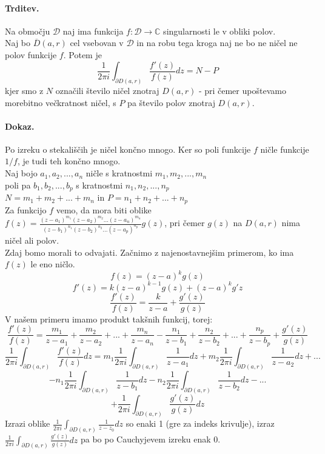\documentclass[a4paper]{article}
\newcommand{\C}{\mathbb{C}}
\newcommand{\fn}[3]{{#1}\colon {#2} \rightarrow {#3}}
\begin{document}
\paragraph{Trditev.} Na območju $\mathcal{D}$ naj ima funkcija $\fn{f}{\mathcal{D}}{\C}$ singularnosti le v obliki polov. \\
Naj bo $\overline{D}(a, r)$ cel vsebovan v $\mathcal{D}$ in na robu tega kroga naj ne bo ne ničel ne polov funkcije $f$. Potem je 
$$\frac{1}{2\pi i}\int_{\partial D(a, r)}\frac{f'(z)}{f(z)}dz = N - P$$
kjer smo z $N$ označili število ničel znotraj $D(a, r)$ - pri čemer upoštevamo morebitno večkratnost ničel, s $P$ pa število polov znotraj $D(a ,r)$. \\
\paragraph{Dokaz.} Po izreku o stekališčih je ničel končno mnogo. Ker so poli funkcije $f$ ničle funkcije $1/f$, je tudi teh končno mnogo. \\
Naj bojo $a_1, a_2, ..., a_n$ ničle s kratnostmi $m_1, m_2, ..., m_n$ \\
poli pa $b_1, b_2, ..., b_p$ s kratnostmi $n_1, n_2, ..., n_p$ \\
$N = m_1 + m_2 + ... + m_n$ in $P = n_1 + n_2 + ... + n_p$ \\
Za funkcijo $f$ vemo, da mora biti oblike $\displaystyle{f(z) = \frac{(z-a_1)^{m_1}(z-a_2)^{m_2}...(z-a_n)^{m_n}}{(z-b_1)^{n_1}(z-b_2)^{n_2}...(z-a_p)^{n_p}}g(z)}$, pri čemer $g(z)$ na $D(a, r)$ nima ničel ali polov. \\
Zdaj bomo morali to odvajati. Začnimo z najenostavnejšim primerom, ko ima $f(z)$ le eno ničlo.
$$f(z) = (z-a)^kg(z)$$
$$f'(z) = k(z-a)^{k-1}g(z) + (z-a)^kg'z$$
$$\frac{f'(z)}{f(z)} = \frac{k}{z-a} + \frac{g'(z)}{g(z)}$$
V našem primeru imamo produkt takšnih funkcij, torej:
$$\frac{f'(z)}{f(z)} = \frac{m_1}{z-a_1} + \frac{m_2}{z-a_2} + ... + \frac{m_n}{z-a_n} - \frac{n_1}{z-b_1} + \frac{n_2}{z-b_2} + ... + \frac{n_p}{z-b_p} + \frac{g'(z)}{g(z)}$$
$$\frac{1}{2\pi i} \int_{\partial D(a, r)} \frac{f'(z)}{f(z)}dz = m_1 \frac{1}{2\pi i} \int_{\partial D(a, r)} \frac{1}{z-a_1}dz + m_2 \frac{1}{2\pi i} \int_{\partial D(a, r)} \frac{1}{z-a_2}dz + ... $$
$$- n_1 \frac{1}{2\pi i} \int_{\partial D(a, r)} \frac{1}{z-b_1}dz - n_2 \frac{1}{2\pi i} \int_{\partial D(a, r)} \frac{1}{z-b_2}dz - ...$$
$$+ \frac{1}{2\pi i} \int_{\partial D(a, r)} \frac{g'(z)}{g(z)}dz$$
Izrazi oblike $\displaystyle{\frac{1}{2\pi i} \int_{\partial D(a, r)}\frac{1}{z-z_0}dz}$ so enaki 1 (gre za indeks krivulje), izraz $\displaystyle{\frac{1}{2\pi i} \int_{\partial D(a, r)} \frac{g'(z)}{g(z)}dz}$ pa bo po Cauchyjevem izreku enak 0.
\end{document}
